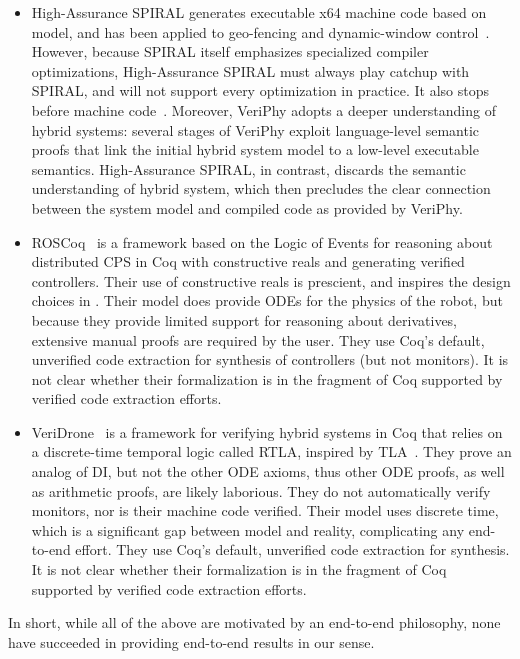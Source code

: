 \documentclass[12pt]{cmuthesis}
\theoremstyle{definition}
\theoremstyle{remark}
\newcommand{\rref}[2][]{\prettyref{#2}}
\newcommand{\VeriPhy}{VeriPhy\xspace}
\begin{document}
\begin{itemize}
\item
  High-Assurance SPIRAL \cite{DBLP:journals/csm/FranchettiLMMGPPKMFJPV17} generates executable x64 machine code based on \dL model, and has been applied to geo-fencing and dynamic-window control~\cite{DBLP:conf/hase/LowF17}.
  However, because SPIRAL itself emphasizes specialized compiler optimizations, High-Assurance SPIRAL must always play catchup with SPIRAL, and will not support every optimization in practice.
  It also stops before machine code~\cite{DBLP:conf/icfp/ZalivaF18}.
  Moreover, \VeriPhy adopts a deeper understanding of hybrid systems: several stages of \VeriPhy exploit language-level semantic proofs that link the initial hybrid system model to a low-level executable semantics.
  High-Assurance SPIRAL, in contrast, discards the semantic understanding of hybrid system, which then precludes the clear connection between the system model and compiled code as provided by \VeriPhy.
\item
ROSCoq~\cite{DBLP:conf/itp/AnandK15} is a framework based on the Logic of Events for reasoning about distributed CPS in Coq with constructive reals and generating verified controllers.
Their use of constructive reals is prescient, and inspires the design choices in \rref{ch:proofplex}.
Their model does provide ODEs for the physics of the robot, but because they provide limited support for reasoning about derivatives, extensive manual proofs are required by the user.
They use Coq's default, unverified code extraction for synthesis of controllers (but not monitors).
It is not clear whether their formalization is in the fragment of Coq supported by verified code extraction efforts.
\item
VeriDrone~\cite{Ricketts:memcode:2015} is a framework for verifying hybrid systems in Coq that relies on a discrete-time temporal logic called RTLA, inspired by TLA~\cite{Lamport:hybrid:1992}.
They prove an analog of DI, but not the other ODE axioms, thus other ODE proofs, as well as arithmetic proofs, are likely laborious.
They do not automatically verify monitors, nor is their machine code verified.
Their model uses discrete time, which is a significant gap between model and reality, complicating any end-to-end effort.
They use Coq's default, unverified code extraction for synthesis.
It is not clear whether their formalization is in the fragment of Coq supported by verified code extraction efforts.
\end{itemize}
In short, while all of the above are motivated by an end-to-end philosophy, none have succeeded in providing end-to-end results in our sense.
\end{document}
